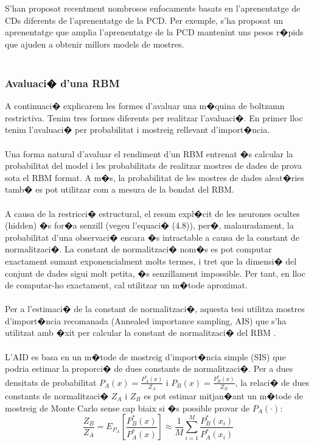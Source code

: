\documentclass[12pt,a4paper,openright,oneside]{article}
\numberwithin{equation}{section}
\theoremstyle{definition}
\begin{document}
S'han proposat recentment nombrosos enfocaments basats en l'aprenentatge de CDs diferents de l'aprenentatge de la PCD. Per exemple, s'ha proposat un aprenentatge que amplia l'aprenentatge de la PCD mantenint uns pesos r�pids que ajuden a obtenir millors models de mostres.\\\\
\subsubsection{Avaluaci� d'una RBM}
A continuaci� explicarem les formes d'avaluar una m�quina de boltzamn restrictiva. Tenim tres formes diferents per realitzar l'avaluaci�. En primer lloc tenim l'avaluaci�  per probabilitat i mostreig rellevant d'import�ncia.\\\\
Una forma natural d'avaluar el rendiment d'un RBM entrenat �s calcular la probabilitat del model i les probabilitats de realitzar mostres de dades de prova sota el RBM format. A m�s, la probabilitat de les mostres de dades aleat�ries tamb� es pot utilitzar com a mesura de la bondat del RBM.\\\\
A causa de la restricci� estructural, el resum expl�cit de les neurones ocultes (hidden) �s for�a senzill (vegeu l'equaci� (4.8)), per�, malauradament, la probabilitat d'una observaci� encara �s intractable a causa de la constant de normalitzaci�. La constant de normalitzaci� nom�s es pot computar exactament sumant exponencialment molts termes, i tret que la dimensi� del conjunt de dades sigui molt petita, �s senzillament impossible. Per tant, en lloc de computar-ho exactament, cal utilitzar un m�tode aproximat.\\\\
Per a l'estimaci� de la constant de normalitzaci�, aquesta tesi utilitza mostres d'import�ncia recomanada (Annealed importance sampling, AIS) que s'ha utilitzat amb �xit per calcular la constant de normalitzaci� del RBM \cite{salakhutdinov}.\\\\
L'AID es basa en un m�tode de mostreig d'import�ncia simple (SIS) que podria estimar la proporci� de dues constants de normalitzaci�. Per a dues densitats de probabilitat ${P_A (x) = \frac{P_A^*(x)}{Z_A}}$ i ${P_B (x) = \frac{P_B^*(x)}{Z_B}}$, la relaci� de dues constants de normalitzaci� ${Z_A}$ i ${Z_B}$ es pot estimar mitjan�ant un m�tode de mostreig de Monte Carlo sense cap biaix si �s possible provar de ${P_A (\cdot)}$:
\begin{equation}
\frac{Z_B}{Z_A} = E_{P_A} [\frac{P_B^*(x)}{P_A^*(x)}] \approx \frac{1}{M} \sum^M_{i=1} \frac{P_B^*(x_i)}{P_A^*(x_i)}
\end{equation}
\end{document}
